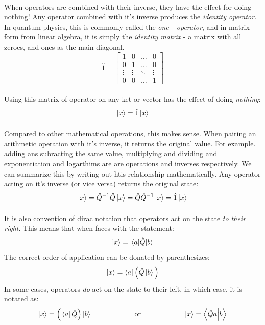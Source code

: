 \documentclass[12pt,letterpaper]{book}
\begin{document}
\paragraph*{}When operators are combined with their inverse, they have the effect for doing nothing! Any operator combined with it's inverse produces the \textit{identity operator}. In quantum physics, this is commonly called the \textit{one - operator}, and in matrix form from linear algebra, it is simply the \textit{identity matrix} - a matrix with all zeroes, and ones as the main diagonal.
\begin{equation}
\label{identity}
\hat{1} = 
\begin{bmatrix}
1 & 0 & \hdots & 0 \\
0 & 1 & \hdots & 0 \\
\vdots & \vdots & \ddots & \vdots \\
0 & 0 & \hdots & 1
\end{bmatrix}
\end{equation}
\paragraph*{}Using this matrix of operator on any ket or vector has the effect of doing \textit{nothing}:
\begin{equation}
\ket{x} = \hat{1}\ket{x}
\end{equation}
\paragraph*{}Compared to other mathematical operations, this makes sense. When pairing an arithmetic operation with it's inverse, it returns the original value. For example. adding ans subracting the same value, multiplying and dividing and exponentiation and logarthims are are operations and inverses respectively. We can summarize this by writing out htis relationship mathematically. Any operator acting on it's inverse (or vice versa) returns the original state:
\begin{equation}
\ket{x} = \hat{Q}^{-1}\hat{Q}\ket{x} = \hat{Q}\hat{Q}^{-1}\ket{x} =
 \hat{1}\ket{x} 
\end{equation}
\paragraph*{}It is also convention of dirac notation that operators act on the state \textit{to their right}. This means that when faces with the statement:
\begin{equation}
\ket{x} = \mel{a}{\hat{Q}}{b}
\end{equation}
The correct order of application can be donated by parenthesizes:
\begin{equation}
\ket{x} = \bra{a}\Big( \hat{Q}\ket{b} \Big)
\end{equation}
In some cases, operators \textit{do} act on the state to their left, in which case, it is notated as:
\begin{equation}
\ket{x} = \Big(\bra{a}\hat{Q}\Big)\ket{b} 
\text{\hspace{2cm} or \hspace{2cm}}
\ket{x} = \braket{\hat{Q}a}{b}
\end{equation}
\end{document}

